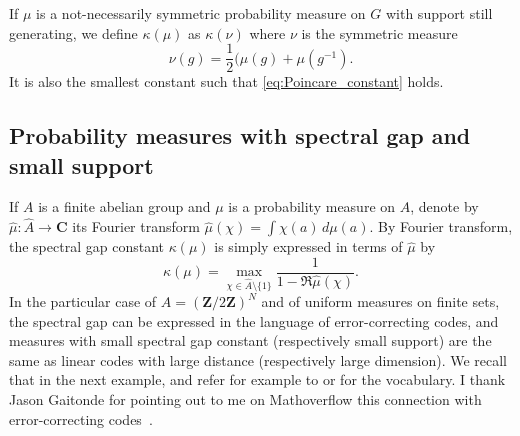 \documentclass[JEP,XML,SOM,Unicode,published]{cedram}
\theoremstyle{plain}
\theoremstyle{definition}
\newcommand{\C}{\mathbf{C}}
\newcommand{\Z}{\mathbf{Z}}
\begin{document}
If $\mu$ is a not-necessarily symmetric probability measure on $G$ with support still generating, we define $\kappa(\mu)$ as $\kappa(\nu)$ where $\nu$ is the symmetric measure\vspace*{-3pt}
\[
\nu(g) = \frac{1}{2}(\mu(g)+\mu(g^{-1}).
\]
It is also the smallest constant such that \eqref{eq:Poincare_constant} holds.


\subsection{Probability measures with spectral gap and small support}
If $A$ is a finite abelian group and $\mu$ is a probability measure on $A$, denote by $\hat \mu:\hat A \to \C$ its Fourier transform $\hat \mu(\chi) = \int \chi(a) \,d\mu(a)$. By Fourier transform, the spectral gap constant $\kappa(\mu)$ is simply expressed in terms of $\hat \mu$ by\vspace*{-3pt}
\begin{equation}\label{eq:spectral_gap_abelian}\kappa(\mu) = \max_{\chi \in \hat A \setminus \{1\}} \frac{1}{1-\Re\hat \mu(\chi)}.
\end{equation}
In the particular case of $A=(\Z/2\Z)^N$ and of uniform measures on finite sets, the spectral gap can be expressed in the language of error-correcting codes, and measures with small spectral gap constant (respectively small support) are the same as linear codes with large distance (respectively large dimension). We recall that in the next example, and refer for example to \cite{MR0465509} or \cite{MR1996953} for the vocabulary. I thank Jason Gaitonde for pointing out to me on Mathoverflow this connection with error-correcting codes~\cite{414657}.
\end{document}
